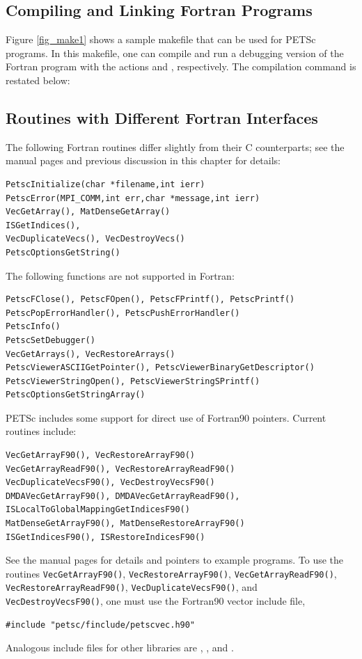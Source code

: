 \subsection{Compiling and Linking Fortran Programs}
\label{sec_fortcompile}

Figure \ref{fig_make1} shows a sample makefile that can be used for
PETSc programs.  In this makefile, one can compile and run a debugging version
of the Fortran program  with the actions    and
 , respectively. The compilation command is restated below:
\begin{makelisting}
ex3: ex3.o 
       -${FLINKER}} -o ex3 ex3.o ${PETSC_LIB}
        ${RM} ex3.o
\end{makelisting}

\subsection{Routines with Different Fortran Interfaces}
\label{sec_fortran_exceptions}

The following Fortran routines differ slightly from their C counterparts; see the
manual pages and previous discussion in this chapter for details:
\begin{lstlisting}
PetscInitialize(char *filename,int ierr)
PetscError(MPI_COMM,int err,char *message,int ierr)
VecGetArray(), MatDenseGetArray()
ISGetIndices(), 
VecDuplicateVecs(), VecDestroyVecs()
PetscOptionsGetString()
\end{lstlisting}
The following functions are not supported in Fortran:
\begin{lstlisting}
PetscFClose(), PetscFOpen(), PetscFPrintf(), PetscPrintf()
PetscPopErrorHandler(), PetscPushErrorHandler()
PetscInfo()
PetscSetDebugger()
VecGetArrays(), VecRestoreArrays()
PetscViewerASCIIGetPointer(), PetscViewerBinaryGetDescriptor()
PetscViewerStringOpen(), PetscViewerStringSPrintf()
PetscOptionsGetStringArray()
\end{lstlisting}

PETSc includes some support for direct use of Fortran90 pointers.
Current routines include:
\begin{lstlisting}
VecGetArrayF90(), VecRestoreArrayF90()
VecGetArrayReadF90(), VecRestoreArrayReadF90()
VecDuplicateVecsF90(), VecDestroyVecsF90()
DMDAVecGetArrayF90(), DMDAVecGetArrayReadF90(), ISLocalToGlobalMappingGetIndicesF90()
MatDenseGetArrayF90(), MatDenseRestoreArrayF90()
ISGetIndicesF90(), ISRestoreIndicesF90()
\end{lstlisting}
See the manual pages for details and pointers to example programs.  To
use the
routines \lstinline{VecGetArrayF90()}, \lstinline{VecRestoreArrayF90()}, \lstinline{VecGetArrayReadF90()}, \lstinline{VecRestoreArrayReadF90()},
\lstinline{VecDuplicateVecsF90()}, and \lstinline{VecDestroyVecsF90()}, one must
use the Fortran90 vector include file,
\begin{lstlisting}
#include "petsc/finclude/petscvec.h90"
\end{lstlisting}
Analogous include files for other libraries are ,
, and .

